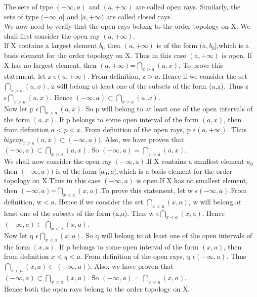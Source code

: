 \documentclass[a4paper,english,12pt]{article}
\begin{document}
\begin{defn}
The sets of type $(-\infty,a)$ and $(a,+\infty)$ are called open rays. Similarly, the sets of type $(-\infty,a]$ and $[a,+\infty)$ are called closed rays.\\
We now need to verify that the open rays belong to the order topology on X. We shall first consider the open ray $(a,+\infty)$.\\
If X contains a largest element $b_0$ then $(a,+\infty)$ is of the form $(a,b_0]$,which is a basis element for the order topology on X. Thus in this case $(a,+\infty)$ is open. If X has no largest element, then $(a,+\infty)$=$\bigcap_{x>a} (a,x)$. To prove this statement, let z $\epsilon (a,+\infty)$. From definition, z$>a$. Hence if we consider the set $\bigcap_{x>a} (a,x)$, z will belong at least one of the subsets of the form (a,x). Thus z $\epsilon \bigcap_{x>a} (a,x)$. Hence $(-\infty,a) \subset \bigcap_{x>a} (a,x)$.\\
Now let p $\epsilon \bigcap_{x>a} (a,x)$. So p will belong to at least one of the open intervals of the form $(a,x)$. If p belongs to some open interval of the form $(a,x)$, then from definition $a<p<x$. From definition of the open rays, p $\epsilon (a,+\infty)$. Thus $bigcap_{x>a} (a,x)\subset (-\infty,a))$. Also, we have proven that $(-\infty,a) \subset \bigcap_{x>a} (a,x)$. So $(-\infty,a)=\bigcap_{x>a} (a,x)$.\\
We shall now consider the open ray $(-\infty,a)$.If X contains a smallest element $a_0$ then $(-\infty,a))$ is of the form $[a_0,a)$,which is a basis element for the order topology on X.Thus in this case $(-\infty,a)$ is open.If X has no smallest element, then $(-\infty,a)$=$\bigcap_{x<a} (x,a)$.To prove this statement, let w $\epsilon (-\infty,a)$.From definition, w$<a$. Hence if we consider the set $\bigcap_{x<a} (x,a)$, w will belong at least one of the subsets of the form (x,a). Thus w $\epsilon \bigcap_{x<a} (x,a)$. Hence $(-\infty,a) \subset \bigcap_{x<a} (x,a)$.\\
Now let q $\epsilon \bigcap_{x<a} (x,a)$. So q will belong to at least one of the open intervals of the form $(x,a)$. If p belongs to some open interval of the form $(x,a)$, then from definition $x<q<a$. From definition of the open rays, q $\epsilon (-\infty,a)$. Thus $\bigcap_{x<a} (x,a)\subset (-\infty,a))$. Also, we have proven that $(-\infty,a) \subset \bigcap_{x<a} (x,a)$. So $(-\infty,a)=\bigcap_{x<a} (x,a)$.\\
Hence both the open rays belong to the order topology on X.\\
\vspace{2mm}

\end{defn}
\end{document}
